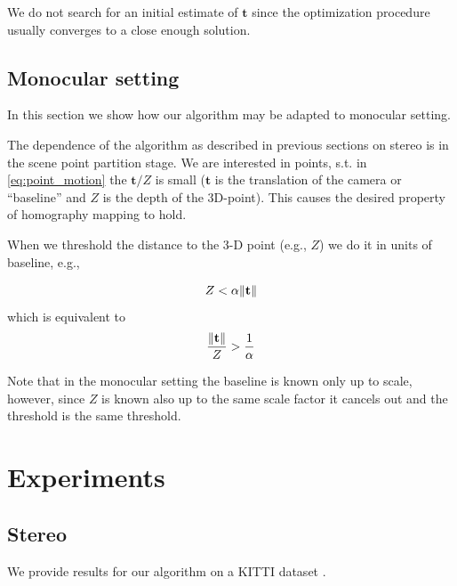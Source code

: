 \documentclass[runningheads]{llncs}
\DeclarePairedDelimiter{\norm}{\lVert}{\rVert}
\begin{document}
We do not search for an initial estimate of $\mathbf{t}$ since the
optimization procedure usually converges to a close enough solution.

\subsection{Monocular setting}

In this section we show how our algorithm may be adapted to monocular
setting.

The dependence of the algorithm as described in previous sections on
stereo is in the scene point partition stage.  We are interested in
points, s.t. in \ref{eq:point_motion} the $\mathbf{t}/Z$ is small
($\mathbf{t}$ is the translation of the camera or ``baseline'' and $Z$
is the depth of the 3D-point). This causes the desired property of
homography mapping to hold.

When we threshold the distance to the 3-D point (e.g., $Z$) we do it
in units of baseline, e.g.,

\begin{equation}
Z<\alpha \norm{ \mathbf{t} }
\end{equation}
which is equivalent to
\begin{equation}
\frac{\norm{\mathbf{t}}}{Z} > \frac{1}{\alpha}
\end{equation}

Note that in the monocular setting the baseline is known only up to scale, however, since $Z$ is known also up to the same scale factor it cancels out and the threshold is the same threshold.

\section{Experiments}

\subsection{Stereo}
We provide results for our algorithm on a KITTI dataset
\cite{Geiger2012}.
\end{document}

